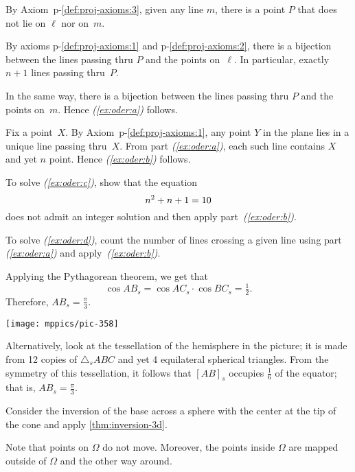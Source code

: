 \begin{multicols}{2}
By Axiom~p-\ref{def:proj-axioms:3}, given any line $m$, there is a point $P$ that does not lie on $\ell$ nor on~$m$.

By axioms p-\ref{def:proj-axioms:1} and p-\ref{def:proj-axioms:2}, there is a bijection between the lines passing thru $P$ and the points on~$\ell$.
In particular, exactly $n+1$ lines passing thru~$P$.

In the same way, there is a bijection between the lines passing thru $P$ and the points on~$m$. 
Hence \textit{(\ref{ex:oder:a})} follows.

Fix a point~$X$.
By Axiom~p-\ref{def:proj-axioms:1}, any point $Y$ in the plane lies in a unique line passing thru~$X$.
From part \textit{(\ref{ex:oder:a})}, each such line contains $X$ and yet $n$ point.
Hence \textit{(\ref{ex:oder:b})} follows.

To solve \textit{(\ref{ex:oder:c})}, show that the equation
\[n^2+n+1\z=10\] 
does not admit an integer solution and then apply part~\textit{(\ref{ex:oder:b})}.


To solve \textit{(\ref{ex:oder:d})}, count the number of lines crossing a given line using part \textit{(\ref{ex:oder:a})} and apply~\textit{(\ref{ex:oder:b})}.

\setcounter{eqtn}{0}



Applying the Pythagorean theorem, we get that
$$
\cos AB_s=\cos AC_s\cdot\cos BC_s=\tfrac12.
$$
Therefore, $AB_s=\tfrac\pi3$.



\begin{Figure}
\vskip-0mm
\centering
\texttt{[image: mppics/pic-358]}
\end{Figure}

Alternatively, 
look at the tessellation of the hemisphere in the picture; 
it is made from 12 copies of $\triangle_s A B C$ and yet 4 equilateral spherical triangles.
From the symmetry of this tessellation, it follows that $[AB]_s$ occupies $\tfrac16$ of the equator; that is, $AB_s=\tfrac\pi3$.

Consider the inversion of the base across a sphere with the center at the tip of the cone and apply \ref{thm:inversion-3d}.

Note that points on $\Omega$ do not move.
Moreover, the points inside $\Omega$ 
are mapped outside of $\Omega$ and the other way around.



\end{multicols}
